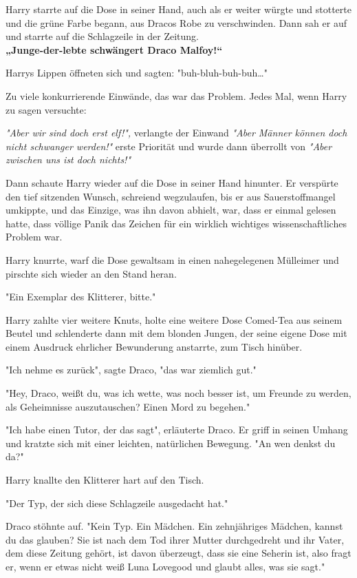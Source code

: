{Harry starrte auf die Dose in seiner Hand, auch als er weiter würgte und stotterte und die grüne Farbe begann, aus Dracos Robe zu verschwinden. Dann sah er auf und starrte auf die Schlagzeile in der Zeitung.\\ \textbf{„Junge-der-lebte schwängert Draco Malfoy!“}

Harrys Lippen öffneten sich und sagten: "buh-bluh-buh-buh…"

Zu viele konkurrierende Einwände, das war das Problem. Jedes Mal, wenn Harry zu sagen versuchte:

\emph{"Aber wir sind doch erst elf!",} verlangte der Einwand \emph{"Aber Männer können doch nicht schwanger werden!"} erste Priorität und wurde dann überrollt von \emph{"Aber zwischen uns ist doch nichts!"}

Dann schaute Harry wieder auf die Dose in seiner Hand hinunter. Er verspürte den tief sitzenden Wunsch, schreiend wegzulaufen, bis er aus Sauerstoffmangel umkippte, und das Einzige, was ihn davon abhielt, war, dass er einmal gelesen hatte, dass völlige Panik das Zeichen für ein wirklich wichtiges wissenschaftliches Problem war.

Harry knurrte, warf die Dose gewaltsam in einen nahegelegenen Mülleimer und pirschte sich wieder an den Stand heran.

"Ein Exemplar des Klitterer, bitte."

Harry zahlte vier weitere Knuts, holte eine weitere Dose Comed-Tea aus seinem Beutel und schlenderte dann mit dem blonden Jungen, der seine eigene Dose mit einem Ausdruck ehrlicher Bewunderung anstarrte, zum Tisch hinüber.

"Ich nehme es zurück", sagte Draco, "das war ziemlich gut."

"Hey, Draco, weißt du, was ich wette, was noch besser ist, um Freunde zu werden, als Geheimnisse auszutauschen? Einen Mord zu begehen."

"Ich habe einen Tutor, der das sagt", erläuterte Draco. Er griff in seinen Umhang und kratzte sich mit einer leichten, natürlichen Bewegung. "An wen denkst du da?"

Harry knallte den Klitterer hart auf den Tisch.

"Der Typ, der sich diese Schlagzeile ausgedacht hat."

Draco stöhnte auf. "Kein Typ. Ein Mädchen. Ein zehnjähriges Mädchen, kannst du das glauben? Sie ist nach dem Tod ihrer Mutter durchgedreht und ihr Vater, dem diese Zeitung gehört, ist davon überzeugt, dass sie eine Seherin ist, also fragt er, wenn er etwas nicht weiß Luna Lovegood und glaubt alles, was sie sagt."

}
